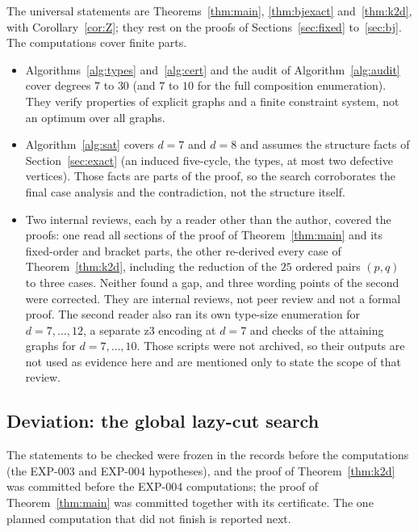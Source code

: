 \documentclass[11pt]{article}
\theoremstyle{remark}
\begin{document}
The universal statements are Theorems~\ref{thm:main}, \ref{thm:bjexact} and~\ref{thm:k2d}, with Corollary~\ref{cor:Z}; they rest on the proofs of Sections~\ref{sec:fixed} to~\ref{sec:bj}. The computations cover finite parts.
\begin{itemize}
\item Algorithms~\ref{alg:types} and~\ref{alg:cert} and the audit of Algorithm~\ref{alg:audit} cover degrees $7$ to $30$ (and $7$ to $10$ for the full composition enumeration). They verify properties of explicit graphs and a finite constraint system, not an optimum over all graphs.
\item Algorithm~\ref{alg:sat} covers $d=7$ and $d=8$ and assumes the structure facts of Section~\ref{sec:exact} (an induced five-cycle, the types, at most two defective vertices). Those facts are parts of the proof, so the search corroborates the final case analysis and the contradiction, not the structure itself.
\item Two internal reviews, each by a reader other than the author, covered the proofs: one read all sections of the proof of Theorem~\ref{thm:main} and its fixed-order and bracket parts, the other re-derived every case of Theorem~\ref{thm:k2d}, including the reduction of the $25$ ordered pairs $(p,q)$ to three cases. Neither found a gap, and three wording points of the second were corrected. They are internal reviews, not peer review and not a formal proof. The second reader also ran its own type-size enumeration for $d=7,\ldots,12$, a separate z3 encoding at $d=7$ and checks of the attaining graphs for $d=7,\ldots,10$. Those scripts were not archived, so their outputs are not used as evidence here and are mentioned only to state the scope of that review.
\end{itemize}

\subsection{Deviation: the global lazy-cut search}

The statements to be checked were frozen in the records before the computations (the EXP-003 and EXP-004 hypotheses), and the proof of Theorem~\ref{thm:k2d} was committed before the EXP-004 computations; the proof of Theorem~\ref{thm:main} was committed together with its certificate. The one planned computation that did not finish is reported next.
\end{document}
